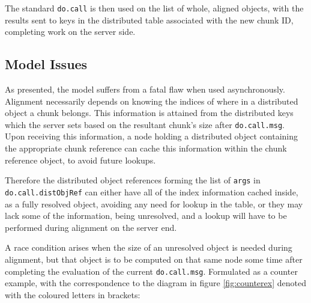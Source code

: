 \documentclass[a4paper,10pt]{article}
\begin{document}
The standard \lstinline[language=R]{do.call} is then used on the list of whole,
aligned objects, with the results sent to keys in the distributed table
associated with the new chunk ID, completing work on the server side.

\subsection{Model Issues}

As presented, the model suffers from a fatal flaw when used asynchronously.
Alignment necessarily depends on knowing the indices of where in a distributed
object a chunk belongs.
This information is attained from the distributed keys which the server sets
based on the resultant chunk's size after \lstinline[language=R]{do.call.msg}.
Upon receiving this information, a node holding a distributed object containing
the appropriate chunk reference can cache this information within the chunk
reference object, to avoid future lookups.

Therefore the distributed object references forming the list of \texttt{args}
in \lstinline[language=R]{do.call.distObjRef} can either have all of the index
information cached inside, as a fully resolved object, avoiding any need for
lookup in the table, or they may lack some of the information, being
unresolved, and a lookup will have to be performed during alignment on the
server end.

A race condition arises when the size of an unresolved object is needed during
alignment, but that object is to be computed on that same node some time after
completing the evaluation of the current \lstinline[language=R]{do.call.msg}. 
\newpage
Formulated as a counter example, with the correspondence to the diagram in
figure \ref{fig:counterex} denoted with the coloured letters in brackets:
\end{document}
